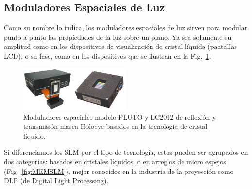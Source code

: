 \subsection{Moduladores Espaciales de Luz}

Como su nombre lo indica, los moduladores espaciales de luz sirven
para modular punto a punto las propiedades de la luz sobre un
plano. Ya sea solamente su amplitud como en los dispositivos de
visualización de cristal líquido (pantallas \acrshort{LCD}), o su fase, como en
los dispositivos que se ilustran en la Fig.~\ref{fig:LCDSLM}.
\begin{figure}[h!]
\centering
    \includegraphics[width=0.5\textwidth]{LCDSLM.png}
\caption[Comparación entre TN-SLM]{Moduladores espaciales modelo PLUTO y LC2012 de reflexión y
  transmisión marca Holoeye basados en la tecnología de cristal
  líquido.}%
\label{fig:LCDSLM}
\end{figure}

Si diferenciamos los SLM por el tipo de tecnología, estos pueden ser
agrupados en dos categorías: basados en cristales líquidos, o en
arreglos de micro espejos (Fig.~\ref{fig:MEMSLM}), mejor 
conocidos en la industria de la proyección como DLP (de Digital Light
Processing).  
